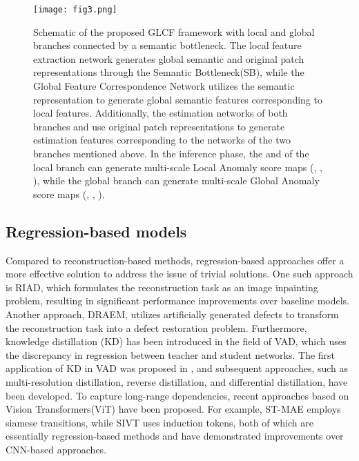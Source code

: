 \documentclass[lettersize,journal]{IEEEtran}
\begin{document}
\begin{figure*}[t]
\centerline{\texttt{[image: fig3.png]}}
\caption[width=\textwidth]{
Schematic of the proposed GLCF framework with local and global branches connected by a semantic bottleneck. The local feature extraction network  generates global semantic and original patch representations through the Semantic Bottleneck(SB), while the Global Feature Correspondence Network  utilizes the semantic representation to generate global semantic features corresponding to local features. Additionally, the estimation networks of both branches  and  use original patch representations to generate estimation features corresponding to the networks of the two branches mentioned above. In the inference phase, the  and   of the local branch can generate multi-scale Local Anomaly score maps (, , ), while the global branch can generate multi-scale Global Anomaly score maps (, , ).
}
\label{fig1}
\end{figure*}

\subsection{Regression-based models}

Compared to reconstruction-based methods, regression-based approaches offer a more effective solution to address the issue of trivial solutions. One such approach is RIAD\cite{r11}, which formulates the reconstruction task as an image inpainting problem, resulting in significant performance improvements over baseline models. Another approach, DRAEM\cite{r20}, utilizes artificially generated defects to transform the reconstruction task into a defect restoration problem.
Furthermore, knowledge distillation (KD) has been introduced in the field of VAD, which uses the discrepancy in regression between teacher and student networks. The first application of KD in VAD was proposed in \cite{r12}, and subsequent approaches, such as multi-resolution distillation\cite{r13}, reverse distillation\cite{r14}, and differential distillation\cite{r15}, have been developed. To capture long-range dependencies, recent approaches based on Vision Transformers(ViT) have been proposed. For example, ST-MAE\cite{r16} employs siamese transitions, while SIVT\cite{r17} uses induction tokens, both of which are essentially regression-based methods and have demonstrated improvements over CNN-based approaches.
\end{document}
